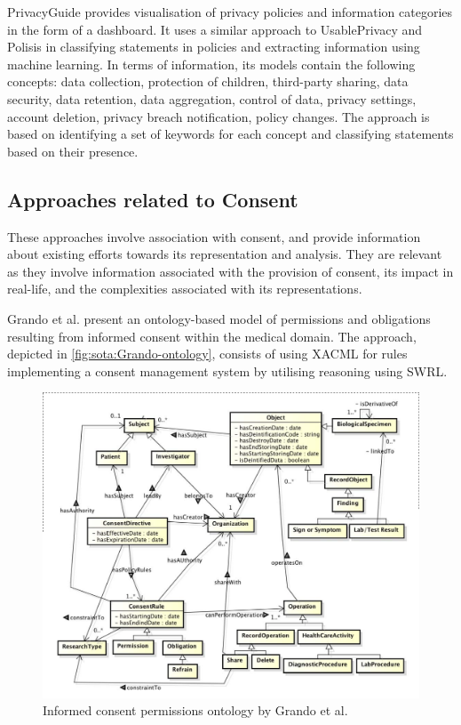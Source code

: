 PrivacyGuide \cite{tesfay_privacyguide:_2018} provides visualisation of privacy policies and information categories in the form of a dashboard. It uses a similar approach to UsablePrivacy and Polisis in classifying statements in policies and extracting information using machine learning. In terms of information, its models contain the following concepts: data collection, protection of children, third-party sharing, data security, data retention, data aggregation, control of data, privacy settings, account deletion, privacy breach notification, policy changes.
The approach is based on identifying a set of keywords for each concept and classifying statements based on their presence.

\subsection{Approaches related to Consent}
These approaches involve association with consent, and provide information about existing efforts towards its representation and analysis. They are relevant as they involve information associated with the provision of consent, its impact in real-life, and the complexities associated with its representations.

Grando et al. \cite{grando_ontological_2012} present an ontology-based model of permissions and obligations resulting from informed consent within the medical domain. The approach, depicted in \autoref{fig:sota:Grando-ontology}, consists of using XACML for rules implementing a consent management system by utilising reasoning using SWRL.
\begin{figure}[htbp]
    \centering
    \includegraphics[width=\linewidth]{img/Grando_ontology.png}
    \caption{Informed consent permissions ontology by Grando et al. \cite{grando_ontological_2012}}
    \label{fig:sota:Grando-ontology}
\end{figure}


